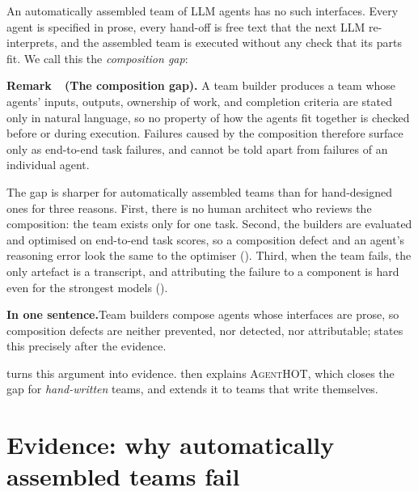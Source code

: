 \documentclass[10pt,a4paper]{article}
\newcommand{\tool}{\textsc{AgentHOT}}
\newcounter{remark}
\newenvironment{remark}[1][]{%
  \refstepcounter{remark}%
  \begin{tcolorbox}[enhanced, colback=accentlight, colframe=accentlight,
      borderline west={2.2pt}{0pt}{accent}, arc=0pt, boxrule=0pt,
      left=8pt, right=8pt, top=5pt, bottom=5pt, before skip=8pt, after skip=8pt]
  \textsf{\bfseries\color{accent}Remark~\theremark\if\relax\detokenize{#1}\relax\else\ (#1)\fi.}\enspace}%
  {\end{tcolorbox}}
\begin{document}
An automatically assembled team of LLM agents has no such interfaces. Every
agent is specified in prose, every hand-off is free text that the next LLM
re-interprets, and the assembled team is executed without any check that its
parts fit. We call this the \emph{composition gap}:

\begin{remark}[The composition gap]
A team builder produces a team whose agents' inputs, outputs, ownership of
work, and completion criteria are stated only in natural language, so no
property of how the agents fit together is checked before or during
execution. Failures caused by the composition therefore surface only as
end-to-end task failures, and cannot be told apart from failures of an
individual agent.
\end{remark}

The gap is sharper for automatically assembled teams than for hand-designed
ones for three reasons. First, there is no human architect who reviews the
composition: the team exists only for one task. Second, the builders are
evaluated and optimised on end-to-end task scores, so a composition defect
and an agent's reasoning error look the same to the optimiser
(). Third, when the team fails, the only artefact is a
transcript, and attributing the failure to a component is hard even for
the strongest models ().

\begin{tcolorbox}[enhanced, colback=accentlight, colframe=accentlight, arc=0pt,
   boxrule=0pt, borderline west={2.2pt}{0pt}{accent}, left=10pt, right=10pt,
   top=6pt, bottom=6pt]
{\sffamily\bfseries\color{accent}In one sentence.}\enspace Team builders
compose agents whose interfaces are prose, so composition defects are
neither prevented, nor detected, nor attributable; 
states this precisely after the evidence.
\end{tcolorbox}

 turns this argument into evidence. 
then explains \tool{}, which closes the gap for \emph{hand-written} teams,
and  extends it to teams that write themselves.
\section{Evidence: why automatically assembled teams fail}\label{sec:evidence}
\end{document}
